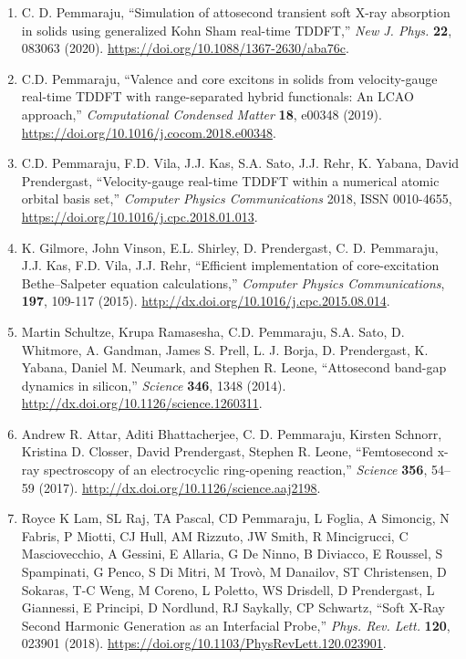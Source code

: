 \begin{enumerate}
    \item C. D. Pemmaraju, “Simulation of attosecond transient soft X-ray absorption in solids using generalized Kohn Sham real-time TDDFT,” {\it New J. Phys.} {\bf 22}, 083063 (2020). \url{https://doi.org/10.1088/1367-2630/aba76c}.
    \item C.D. Pemmaraju, “Valence and core excitons in solids from velocity-gauge real-time TDDFT with range-separated hybrid functionals: An LCAO approach,” {\it Computational Condensed Matter} {\bf 18}, e00348 (2019).  \url{https://doi.org/10.1016/j.cocom.2018.e00348}.
    \item C.D. Pemmaraju, F.D. Vila, J.J. Kas, S.A. Sato, J.J. Rehr, K. Yabana, David Prendergast, “Velocity-gauge real-time TDDFT within a numerical atomic orbital basis set,” {\it Computer Physics Communications} 2018, ISSN 0010-4655, \url{https://doi.org/10.1016/j.cpc.2018.01.013}.
    \item K. Gilmore,  John Vinson, E.L. Shirley, D. Prendergast, C. D. Pemmaraju,  J.J. Kas, F.D. Vila,  J.J. Rehr, “Efficient implementation of core-excitation Bethe–Salpeter equation calculations,” {\it Computer Physics Communications}, {\bf 197}, 109-117 (2015). \url{http://dx.doi.org/10.1016/j.cpc.2015.08.014}.
    \item Martin Schultze, Krupa Ramasesha, C.D. Pemmaraju, S.A. Sato, D. Whitmore, A. Gandman, James S. Prell, L. J. Borja, D. Prendergast, K. Yabana, Daniel M. Neumark, and Stephen R. Leone, “Attosecond band-gap dynamics in silicon,” {\it Science} {\bf 346}, 1348 (2014). \url{http://dx.doi.org/10.1126/science.1260311}. 
    \item Andrew R. Attar, Aditi Bhattacherjee, C. D. Pemmaraju, Kirsten Schnorr, Kristina D. Closser, David Prendergast, Stephen R. Leone, “Femtosecond x-ray spectroscopy of an electrocyclic ring-opening reaction,” {\it Science} {\bf 356}, 54–59 (2017). \url{http://dx.doi.org/10.1126/science.aaj2198}. 
    \item Royce K Lam, SL Raj, TA Pascal, CD Pemmaraju, L Foglia, A Simoncig, N Fabris, P Miotti, CJ Hull, AM Rizzuto, JW Smith, R Mincigrucci, C Masciovecchio, A Gessini, E Allaria, G De Ninno, B Diviacco, E Roussel, S Spampinati, G Penco, S Di Mitri, M Trovò, M Danailov, ST Christensen, D Sokaras, T-C Weng, M Coreno, L Poletto, WS Drisdell, D Prendergast, L Giannessi, E Principi, D Nordlund, RJ Saykally, CP Schwartz, “Soft X-Ray Second Harmonic Generation as an Interfacial Probe,” {\it Phys. Rev. Lett.} {\bf 120}, 023901 (2018). \url{https://doi.org/10.1103/PhysRevLett.120.023901}.

\end{enumerate}

